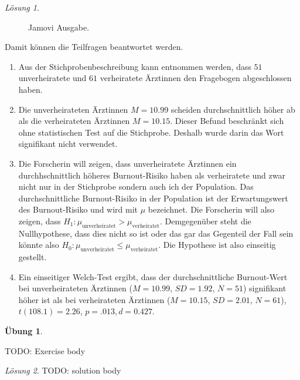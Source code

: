 \documentclass[
]{book}
\providecommand{\tightlist}{%
  \setlength{\itemsep}{0pt}\setlength{\parskip}{0pt}}
\theoremstyle{definition}
\theoremstyle{definition}
\theoremstyle{definition}
\newtheorem{exercise}{Übung}[chapter]
\theoremstyle{definition}
\theoremstyle{remark}
\newtheorem*{solution}{Lösung}
\begin{document}
\begin{solution}
\begin{figure}
{}

\caption{Jamovi Ausgabe.}\label{fig:sol-ehe-burnout-output}
\end{figure}

Damit können die Teilfragen beantwortet werden.

\begin{enumerate}
\def\labelenumi{\alph{enumi})}
\tightlist
\item
  Aus der Stichprobenbeschreibung kann entnommen werden, dass \(51\) unverheiratete und \(61\) verheiratete Ärztinnen den Fragebogen abgeschlossen haben.
\item
  Die unverheirateten Ärztinnen \(M = 10.99\) scheiden durchschnittlich höher ab als die verheirateten Ärztinnen \(M = 10.15\). Dieser Befund beschränkt sich ohne statistischen Test auf die Stichprobe. Deshalb wurde darin das Wort signifikant nicht verwendet.
\item
  Die Forscherin will zeigen, dass unverheiratete Ärztinnen ein durchhschnittlich höheres Burnout-Risiko haben als verheiratete und zwar nicht nur in der Stichprobe sondern auch ich der Population. Das durchschnittliche Burnout-Risiko in der Population ist der Erwartungswert des Burnout-Risiko und wird mit \(\mu\) bezeichnet. Die Forscherin will also zeigen, dass \(H_1: \mu_\text{unverheiratet} > \mu_\text{verheiratet}\). Demgegenüber steht die Nullhypothese, dass dies nicht so ist oder das gar das Gegenteil der Fall sein könnte also \(H_0: \mu_\text{unverheiratet} \leq \mu_\text{verheiratet}\). Die Hypothese ist also einseitig gestellt.
\item
  Ein einseitiger Welch-Test ergibt, dass der durchschnittliche Burnout-Wert bei unverheirateten Ärztinnen (\(M = 10.99\), \(SD = 1.92\), \(N = 51\)) signifikant höher ist als bei verheirateten Ärztinnen (\(M = 10.15\), \(SD = 2.01\), \(N = 61\)), \(t(108.1) = 2.26\), \(p = .013, d = 0.427\).
\end{enumerate}

\end{solution}

\begin{exercise}
\protect\hypertarget{exr:tagname5}{}\label{exr:tagname5}\leavevmode

TODO: Exercise body

\end{exercise}

\begin{solution}
TODO: solution body
\end{solution}
\end{document}
